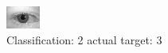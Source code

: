 \begin{figure}[h!]
\begin{center}
\includegraphics[width=0.60\columnwidth]{figures/ID590_class_2_target_3.png}
\end{center}
\caption{ Classification: 2 actual target: 3}
\label{fig:ID590_class_2_target_3}
\end{figure}
